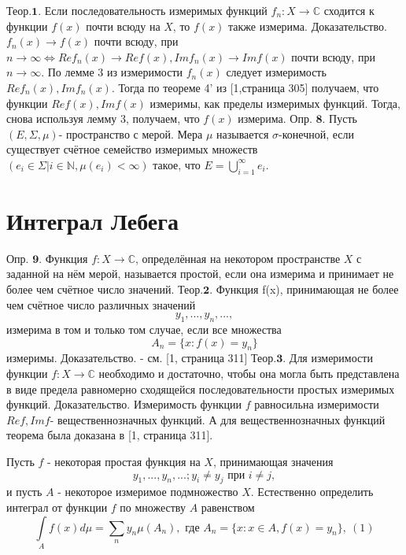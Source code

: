 \documentclass[a4paper,14pt]{article}
\begin{document}
$\textbf{Теор.1.}$ Если последовательность измеримых функций $f_n:X\rightarrow\mathbb{C}$ сходится к функции $f(x)$ почти всюду на $X$, то $f(x)$ также измерима.\newline
$\textbf{Доказательство.}$ $f_n(x)\rightarrow f(x)$ почти всюду, при $n\rightarrow\infty\Leftrightarrow Ref_n(x)\rightarrow Ref(x),Imf_n(x)\rightarrow Imf(x)$ почти всюду, при $n\rightarrow\infty$.\newline
По лемме 3 из измеримости $f_n(x)$ следует измеримость $Ref_n(x),Imf_n(x)$. Тогда по теореме 4' из [1,страница 305] получаем, что функции $Ref(x),Imf(x)$ измеримы, как пределы измеримых функций. Тогда, снова используя лемму 3, получаем, что $f(x)$ измерима.\newline
$\textbf{Опр. 8.}$ Пусть $(E,\Sigma,\mu)$- пространство с мерой. Мера $\mu$ называется $\sigma$-конечной, если существует счётное семейство измеримых множеств $(e_i\in\Sigma|i\in\mathbb{N},\mu(e_i)<\infty)$ такое, что $E=\bigcup\limits_{i=1}^{\infty}e_i$.\newline

\section{Интеграл Лебега}
$\textbf{Опр. 9.}$ Функция $f:X\rightarrow\mathbb{C}$, определённая на некотором пространстве $X$ с заданной на нём мерой, называется простой, если она измерима и принимает не более чем счётное число значений.\newline
$\textbf{Теор.2.}$ Функция f(x), принимающая не более чем счётное число различных значений $$y_1,...,y_n,...,$$ измерима в том и только том случае, если все множества $$A_n=\{x:f(x)=y_n\}$$ измеримы.\newline
$\textbf{Доказательство.}$ - см. [1, страница 311]\newline
$\textbf{Теор.3.}$ Для измеримости функции $f:X\rightarrow\mathbb{C}$ необходимо и достаточно, чтобы она могла быть представлена в виде предела равномерно сходящейся последовательности простых измеримых функций.\newline
$\textbf{Доказательство.}$ Измеримость функции $f$ равносильна измеримости $Ref,Imf$- вещественнозначных функций. А для вещественнозначных функций теорема была доказана в [1, страница 311].\newline


Пусть $f$ - некоторая простая функция на $X$, принимающая значения $$y_1,...,y_n,...;y_i\neq y_j\text{ при } i \neq j,$$ и пусть $A$ - некоторое измеримое подмножество $X$. Естественно определить интеграл от функции $f$ по множеству $A$ равенством $$\int\limits_A f(x)d\mu=\sum\limits_n y_n\mu(A_n),\text{ где }A_n=\{x:x\in A, f(x)=y_n\},\ (1)$$
\end{document}
